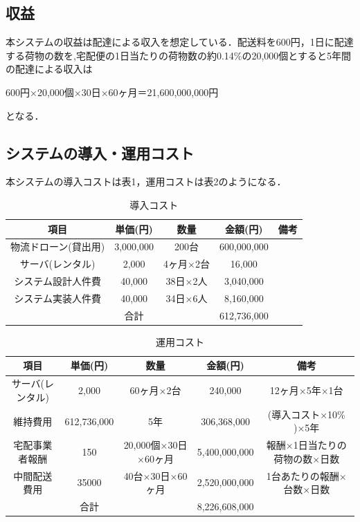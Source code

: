 \documentclass[a4paper, titlepage]{jsarticle}
\begin{document}
\subsection{収益}
本システムの収益は配達による収入を想定している．配送料を600円，1日に配達する荷物の数を,宅配便の1日当たりの荷物数の約0.14\%の20,000個とすると5年間の配達による収入は
\begin{center}
        600円×20,000個×30日×60ヶ月＝21,600,000,000円
\end{center}
となる．

\subsection{システムの導入・運用コスト}
本システムの導入コストは表1，運用コストは表2のようになる．
\begin{table}[htbp]
        \centering
        \begin{tabular}{c c c c c}
                \hline
                項目          & 単価(円)     & 数量     & 金額(円)       & 備考 \\
                \hline \hline
                物流ドローン(貸出用) & 3,000,000 & 200台   & 600,000,000 &    \\
                サーバ(レンタル)   & 2,000     & 4ヶ月×2台 & 16,000      &    \\
                システム設計人件費   & 40,000    & 38日×2人 & 3,040,000   &    \\
                システム実装人件費   & 40,000    & 34日×6人 & 8,160,000   &    \\
                \hline \hline
                            & 合計        &        & 612,736,000 &    \\
                \hline
        \end{tabular}
        \caption{導入コスト}
        \label{tab:label1}
\end{table}

\begin{table}[htbp]
        \centering
        \begin{tabular}{c c c c c}
                \hline
                項目        & 単価(円)       & 数量               & 金額(円)         & 備考               \\
                \hline \hline
                サーバ(レンタル) & 2,000       & 60ヶ月×2台          & 240,000       & 12ヶ月×5年×1台       \\
                維持費用      & 612,736,000 & 5年               & 306,368,000   & (導入コスト×10\% )×5年 \\
                宅配事業者報酬   & 150         & 20,000個×30日×60ヶ月 & 5,400,000,000 & 報酬×1日当たりの荷物の数×日数 \\
                中間配送費用    & 35000       & 40台×30日×60ヶ月     & 2,520,000,000 & 1台あたりの報酬×台数×日数   \\
                \hline \hline
                          & 合計          &                  & 8,226,608,000 &                  \\
                \hline
        \end{tabular}
        \caption{運用コスト}
        \label{tab:label2}
\end{table}
\end{document}
